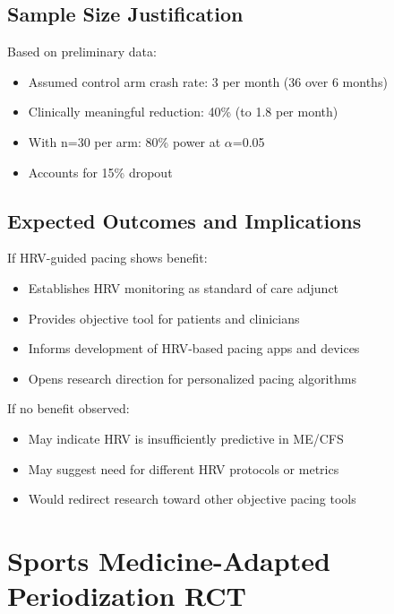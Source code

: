 \subsection{Sample Size Justification}

Based on preliminary data:
\begin{itemize}
    \item Assumed control arm crash rate: 3 per month (36 over 6 months)
    \item Clinically meaningful reduction: 40\% (to 1.8 per month)
    \item With n=30 per arm: 80\% power at $\alpha$=0.05
    \item Accounts for 15\% dropout
\end{itemize}

\subsection{Expected Outcomes and Implications}

If HRV-guided pacing shows benefit:
\begin{itemize}
    \item Establishes HRV monitoring as standard of care adjunct
    \item Provides objective tool for patients and clinicians
    \item Informs development of HRV-based pacing apps and devices
    \item Opens research direction for personalized pacing algorithms
\end{itemize}

If no benefit observed:
\begin{itemize}
    \item May indicate HRV is insufficiently predictive in ME/CFS
    \item May suggest need for different HRV protocols or metrics
    \item Would redirect research toward other objective pacing tools
\end{itemize}

\section{Sports Medicine-Adapted Periodization RCT}
\label{sec:periodization-rct-proposal}

